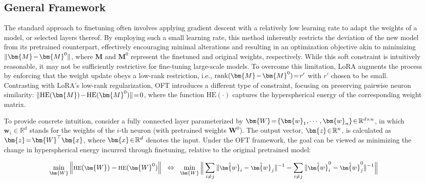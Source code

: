 \subsection{General Framework}

The standard approach to finetuning often involves applying gradient descent with a relatively low learning rate to adapt the weights of a model, or selected layers thereof. By employing such a small learning rate, this method inherently restricts the deviation of the new model from its pretrained counterpart, effectively encouraging minimal alterations and resulting in an optimization objective akin to minimizing $\thickmuskip=2mu \medmuskip=2mu \| \bm{M} - \bm{M}^0\|$, where $\bm{M}$ and $\bm{M}^0$ represent the finetuned and original weights, respectively. While this soft constraint is intuitively reasonable, it may not be sufficiently restrictive for fine-tuning large-scale models. To overcome this limitation, LoRA augments the process by enforcing that the weight update obeys a low-rank restriction, i.e., $\thickmuskip=2mu \medmuskip=2mu \text{rank}(\bm{M} - \bm{M}^0)=r'$ with $r'$ chosen to be small. Contrasting with LoRA’s low-rank regularization, OFT introduces a different type of constraint, focusing on preserving pairwise neuron similarity: $\thickmuskip=2mu \medmuskip=2mu \| \text{HE}(\bm{M})-\text{HE}(\bm{M}^0) \|=0$, where the function $\text{HE}(\cdot)$ captures the hyperspherical energy of the corresponding weight matrix. 

To provide concrete intuition, consider a fully connected layer parameterized by $\thickmuskip=2mu \medmuskip=2mu \bm{W}=\{\bm{w}_1,\cdots,\bm{w}_n\}\in\mathbb{R}^{d\times n}$, in which $\bm{w}_i\in\mathbb{R}^{d}$ stands for the weights of the $i$-th neuron (with pretrained weights $\bm{W}^0$). The output vector, $\thickmuskip=2mu \medmuskip=2mu \bm{z}\in\mathbb{R}^n$, is calculated as $\thickmuskip=2mu \medmuskip=2mu \bm{z}=\bm{W}^\top\bm{x}$, where $\thickmuskip=2mu \medmuskip=2mu \bm{x}\in\mathbb{R}^d$ denotes the input. Under the OFT framework, the goal can be viewed as minimizing the change in hyperspherical energy incurred through finetuning, relative to the original pretrained model:

\begin{equation}\label{eq:oft_principle}
\footnotesize
\min_{\bm{W}} \left\| \text{HE}(\bm{W})-\text{HE}(\bm{W}^0)\right\|~~\Leftrightarrow~~\min_{\bm{W}} \bigg{\|} \sum_{i\neq j} \|\hat{\bm{w}}_i-\hat{\bm{w}}_j\|^{-1}-\sum_{i\neq j} \|\hat{\bm{w}}^0_i-\hat{\bm{w}}^0_j\|^{-1}\bigg{\|}
\end{equation}

